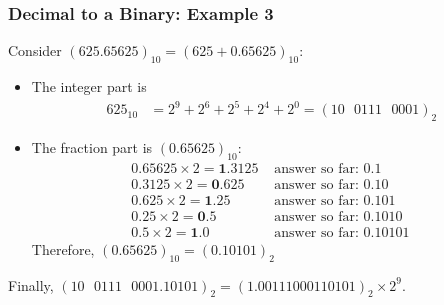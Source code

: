 

\begin{frame}\frametitle{Decimal to a Binary: Example 3}

Consider $(625.65625)_{10}=(625+0.65625)_{10}$:
\begin{itemize}
\item The integer part is 
\begin{align*}
625_{10}&= 2^9 + 2^6 + 2^5 + 2^4+2^0 =(10\text{ }0111\text{ }0001)_2
\end{align*}
\item The fraction part is $(0.65625)_{10}$:
\begin{align*}
0.65625 \times 2 = \mathbf{1}.3125 &\text{ answer so far: 0.1}\\
0.3125 \times 2 = \mathbf{0}.625   &\text{ answer so far: 0.10}\\
0.625 \times 2 = \mathbf{1}.25     &\text{ answer so far: 0.101}\\
0.25 \times 2  = \mathbf{0}.5      &\text{ answer so far: 0.1010} \\
0.5 \times 2  = \mathbf{1}.0       &\text{ answer so far: 0.10101} \
\end{align*}
Therefore, $(0.65625)_{10}=(0.10101)_{2}$
\end{itemize}
Finally, $(10\text{ }0111\text{ }0001.10101)_2=(1.00111000110101)_2\times 2^9$.
\end{frame}

